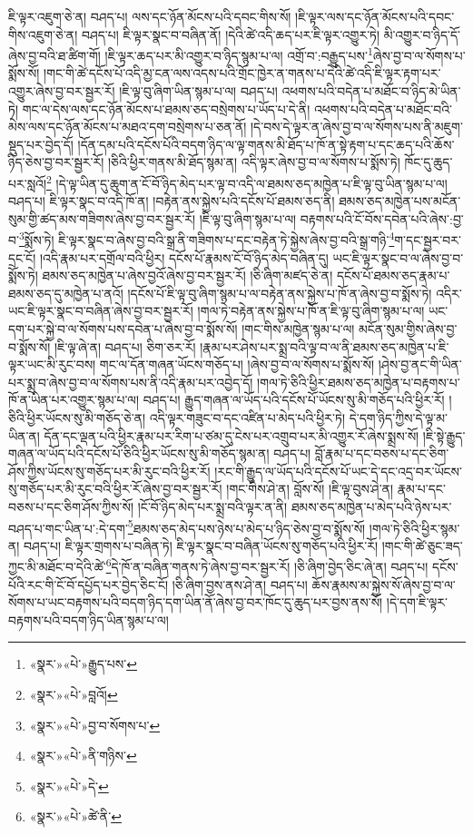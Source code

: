 ཇི་ལྟར་འཇུག་ཅེ་ན། བཤད་པ། ལས་དང་ཉོན་མོངས་པའི་དབང་གིས་སོ། །ཇི་ལྟར་ལས་དང་ཉོན་མོངས་པའི་དབང་གིས་འཇུག་ཅེ་ན། བཤད་པ། ཇི་ལྟར་སྣང་བ་བཞིན་ནོ། །དེའི་ཚེ་འདི་ཆད་པར་ཇི་ལྟར་འགྱུར་ཏེ། མི་འགྱུར་བ་ཉིད་དོ་ཞེས་བྱ་བའི་ཐ་ཚིག་གོ། །ཇི་ལྟར་ཆད་པར་མི་འགྱུར་བ་ཉིད་སྙམ་པ་ལ། འགྲོ་བ་:བརྒྱུད་པས་\footnote{«སྣར་»«པེ་»རྒྱུད་པས་}ཞེས་བྱ་བ་ལ་སོགས་པ་སྨོས་སོ། །གང་གི་ཚེ་དངོས་པོ་འདི་མྱ་ངན་ལས་འདས་པའི་གྲོང་ཁྱེར་ན་གནས་པ་དེའི་ཚེ་འདི་ཇི་ལྟར་རྟག་པར་འགྱུར་ཞེས་བྱ་བར་སྦྱར་རོ། །ཇི་ལྟ་བུ་ཞིག་ཡིན་སྙམ་པ་ལ། བཤད་པ། འཕགས་པའི་བདེན་པ་མཐོང་བ་ཉིད་མེ་ཡིན་ཏེ། གང་ལ་དེས་ལས་དང་ཉོན་མོངས་པ་ཐམས་ཅད་བསྲེགས་པ་ཡོད་པ་དེ་ནི། འཕགས་པའི་བདེན་པ་མཐོང་བའི་མེས་ལས་དང་ཉོན་མོངས་པ་མཐའ་དག་བསྲེགས་པ་ཅན་ནོ། །དེ་བས་དེ་ལྟར་ན་ཞེས་བྱ་བ་ལ་སོགས་པས་ནི་མཇུག་སྡུད་པར་བྱེད་དོ། །དོན་དམ་པའི་དངོས་པོའི་བདག་ཉིད་ལ་ལྟ་གནས་མི་ཐོད་པ་ཁོ་ན་སྟེ་རྟག་པ་དང་ཆད་པའི་ཆོས་ཉིད་ཅེས་བྱ་བར་སྦྱར་རོ། །ཅིའི་ཕྱིར་གནས་མི་ཐོད་སྙམ་ན། འདི་ལྟར་ཞེས་བྱ་བ་ལ་སོགས་པ་སྨོས་ཏེ། ཁོང་དུ་ཆུད་པར་སླའོ།\footnote{«སྣར་»«པེ་»བླའོ།} །དེ་ལྟ་ཡིན་དུ་ཆུག་ན་ངོ་བོ་ཉིད་མེད་པར་ལྟ་བ་འདི་ལ་ཐམས་ཅད་མཁྱེན་པ་ཇི་ལྟ་བུ་ཡིན་སྙམ་པ་ལ། བཤད་པ། ཇི་ལྟར་སྣང་བ་འདི་ཁོ་ན། །བརྟེན་ནས་སྐྱེས་པའི་དངོས་པོ་ཐམས་ཅད་ནི། ཐམས་ཅད་མཁྱེན་པས་མངོན་སུམ་གྱི་ཚད་མས་གཟིགས་ཞེས་བྱ་བར་སྦྱར་རོ། །ཇི་ལྟ་བུ་ཞིག་སྙམ་པ་ལ། བརྟགས་པའི་ངོ་བོས་དབེན་པའི་ཞེས་:བྱ་བ་\footnote{«སྣར་»«པེ་»བྱ་བ་སོགས་པ་}སྨོས་ཏེ། ཇི་ལྟར་སྣང་བ་ཞེས་བྱ་བའི་སྒྲ་ནི་གཟིགས་པ་དང་བརྟེན་ཏེ་སྐྱེས་ཞེས་བྱ་བའི་སྒྲ་གཉི་\footnote{«སྣར་»«པེ་»ནི་གཉིས་}ག་དང་སྦྱར་བར་དྲང་ངོ། །འདི་རྣམ་པར་དགྲོལ་བའི་ཕྱིར། དངོས་པོ་རྣམས་ངོ་བོ་ཉིད་མེད་བཞིན་དུ། ཡང་ཇི་ལྟར་སྣང་བ་ལ་ཞེས་བྱ་བ་སྨོས་ཏེ། ཐམས་ཅད་མཁྱེན་པ་ཞེས་བྱའོ་ཞེས་བྱ་བར་སྦྱར་རོ། །ཅི་ཞིག་མཛད་ཅེ་ན། དངོས་པོ་ཐམས་ཅད་རྣམ་པ་ཐམས་ཅད་དུ་མཁྱེན་པ་ནའོ། །དངོས་པོ་ཇི་ལྟ་བུ་ཞིག་སྙམ་པ་ལ་བརྟེན་ནས་སྐྱེས་པ་ཁོ་ན་ཞེས་བྱ་བ་སྨོས་ཏེ། འདིར་ཡང་ཇི་ལྟར་སྣང་བ་བཞིན་ཞེས་བྱ་བར་སྦྱར་རོ། །གལ་ཏེ་བརྟེན་ནས་སྐྱེས་པ་ཁོ་ན་ཇི་ལྟ་བུ་ཞིག་སྙམ་པ་ལ། ཡང་དག་པར་སྐྱེ་བ་ལ་སོགས་པས་དབེན་པ་ཞེས་བྱ་བ་སྨོས་སོ། །གང་གིས་མཁྱེན་སྙམ་པ་ལ། མངོན་སུམ་གྱིས་ཞེས་བྱ་བ་སྨོས་སོ། །ཇི་ལྟ་ཞེ་ན། བཤད་པ། ཅིག་ཅར་རོ། །རྣམ་པར་ཤེས་པར་སྨྲ་བའི་ལྟ་བ་ལ་ནི་ཐམས་ཅད་མཁྱེན་པ་ཇི་ལྟར་ཡང་མི་རུང་བས། གང་ལ་དོན་གཞན་ཡོངས་གཅོད་པ། །ཞེས་བྱ་བ་ལ་སོགས་པ་སྨོས་སོ། །ཤེས་བྱ་ནང་གི་ཡིན་པར་སྨྲ་བ་ཞེས་བྱ་བ་ལ་སོགས་པས་ནི་འདི་རྣམ་པར་འབྱེད་དོ། །གལ་ཏེ་ཅིའི་ཕྱིར་ཐམས་ཅད་མཁྱེན་པ་བརྟགས་པ་ཁོ་ན་ཡིན་པར་འགྱུར་སྙམ་པ་ལ། བཤད་པ། རྒྱུད་གཞན་ལ་ཡོད་པའི་དངོས་པོ་ཡོངས་སུ་མི་གཅོད་པའི་ཕྱིར་རོ། །ཅིའི་ཕྱིར་ཡོངས་སུ་མི་གཅོད་ཅེ་ན། འདི་ལྟར་གཟུང་བ་དང་འཛིན་པ་མེད་པའི་ཕྱིར་ཏེ། དེ་དག་ཉིད་ཀྱིས་དེ་ལྟ་མ་ཡིན་ན། དོན་དང་ལྡན་པའི་ཕྱིར་རྣམ་པར་རིག་པ་ཙམ་དུ་ངེས་པར་འགྲུབ་པར་མི་འགྱུར་རོ་ཞེས་སྨྲས་སོ། །ཇི་སྟེ་རྒྱུད་གཞན་ལ་ཡོད་པའི་དངོས་པོ་ཅིའི་ཕྱིར་ཡོངས་སུ་མི་གཅོད་སྙམ་ན། བཤད་པ། བློ་རྣམ་པ་དང་བཅས་པ་དང་ཅིག་ཤོས་ཀྱིས་ཡོངས་སུ་གཅོད་པར་མི་རུང་བའི་ཕྱིར་རོ། །རང་གི་རྒྱུད་ལ་ཡོད་པའི་དངོས་པོ་ཡང་དེ་དང་འདྲ་བར་ཡོངས་སུ་གཅོད་པར་མི་རུང་བའི་ཕྱིར་རོ་ཞེས་བྱ་བར་སྦྱར་རོ། །གང་གིས་ཤེ་ན། བློས་སོ། །ཇི་ལྟ་བུས་ཤེ་ན། རྣམ་པ་དང་བཅས་པ་དང་ཅིག་ཤོས་ཀྱིས་སོ། །ངོ་བོ་ཉིད་མེད་པར་སྨྲ་བའི་ལྟར་ན་ནི། ཐམས་ཅད་མཁྱེན་པ་མེད་པའི་ཉེས་པར་བཤད་པ་གང་ཡིན་པ་:དེ་དག་\footnote{«སྣར་»«པེ་»དེ་}ཐམས་ཅད་མེད་པས་ཉེས་པ་མེད་པ་ཉིད་ཅེས་བྱ་བ་སྨོས་སོ། །གལ་ཏེ་ཅིའི་ཕྱིར་སྙམ་ན། བཤད་པ། ཇི་ལྟར་གྲགས་པ་བཞིན་ཏེ། ཇི་ལྟར་སྣང་བ་བཞིན་ཡོངས་སུ་གཅོད་པའི་ཕྱིར་རོ། །གང་གི་ཚེ་ཅུང་ཟད་ཀྱང་མི་མཐོང་བ་དེའི་ཚེ་\footnote{«སྣར་»«པེ་»ཚེ་ནི་}དེ་ཁོ་ན་བཞིན་གནས་ཏེ་ཞེས་བྱ་བར་སྦྱར་རོ། །ཅི་ཞིག་བྱེད་ཅིང་ཞེ་ན། བཤད་པ། དངོས་པོའི་རང་གི་ངོ་བོ་དཔྱོད་པར་བྱེད་ཅིང་ངོ། །ཅི་ཞིག་བྱས་ནས་ཤེ་ན། བཤད་པ། ཆོས་རྣམས་མ་སྐྱེས་སོ་ཞེས་བྱ་བ་ལ་སོགས་པ་ཡང་བརྟགས་པའི་བདག་ཉིད་དག་ཡིན་ནོ་ཞེས་བྱ་བར་ཁོང་དུ་ཆུད་པར་བྱས་ནས་སོ། །དེ་དག་ཇི་ལྟར་བརྟགས་པའི་བདག་ཉིད་ཡིན་སྙམ་པ་ལ། 
